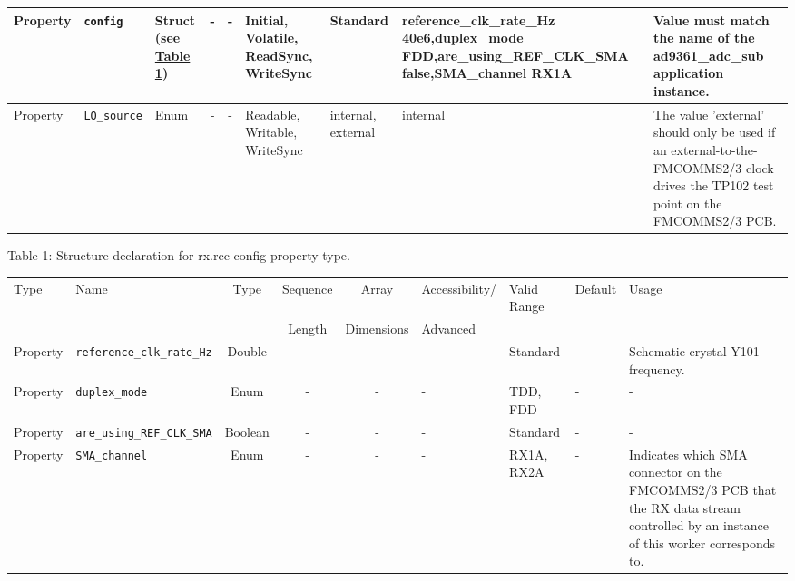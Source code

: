 \documentclass{article}
\def\comp{rx}
\begin{document}
\begin{landscape}
\begin{scriptsize}
\begin{longtable}{|p{1.8cm}|p{4.1cm}|p{1cm}|c|c|p{1.6cm}|p{3.7cm}|p{3.7cm}|p{2.5cm}|}
			\hline
			Property & \verb+config+ & Struct (see \hyperlink{tab1}{Table 1}) & -        & -        & Initial, Volatile, ReadSync, WriteSync & Standard & reference\_clk\_rate\_Hz 40e6,duplex\_mode FDD,are\_using\_REF\_CLK\_SMA false,SMA\_channel RX1A & Value must match the name of the ad9361\_adc\_sub application instance. \\
			\hline
			Property & \verb+LO_source+ &Enum& -        & -        & Readable, Writable, WriteSync & internal, external  & internal & The value 'external' should only be used if an external-to-the-FMCOMMS2/3 clock drives the TP102 test point on the FMCOMMS2/3 PCB. \\
			\hline
		\end{longtable}
	\end{scriptsize}

	Table \hypertarget{tab1}{1}: Structure declaration for \comp{}.rcc config property type.
	\begin{scriptsize}
		\begin{longtable}{|p{1.8cm}|p{3.6cm}|c|c|c|p{2cm}|p{3.7cm}|p{3.7cm}|p{2.5cm}|}
			\hline
			\rowcolor{blue}
			Type         & Name                                & Type & Sequence & Array      & Accessibility/ & Valid Range  & Default & Usage                                                                                                                                                                                                                       \\
			\rowcolor{blue}
			             &                                     &      & Length   & Dimensions & Advanced       &              &         &                                                                                                                                                                                                                             \\
			\hline
			Property     & \verb+reference_clk_rate_Hz+                   & Double & -        & -          & - & Standard & - & Schematic crystal Y101 frequency. \\
			\hline
			Property     & \verb+duplex_mode+                             & Enum   & -        & -          & - & TDD, FDD & - & - \\
			\hline
			Property     & \verb+are_using_REF_CLK_SMA+                             & Boolean& -        & -          & - & Standard & - & - \\
			\hline
			Property     & \verb+SMA_channel+                                       & Enum   & -        & -          & - & RX1A, RX2A & - & Indicates which SMA connector on the FMCOMMS2/3 PCB that the RX data stream controlled by an instance of this worker corresponds to. \\
			\hline
		\end{longtable}
	\end{scriptsize}

\end{landscape}
\end{document}
